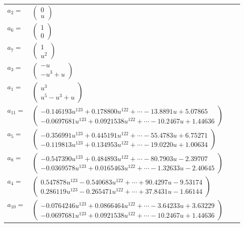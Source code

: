 \documentclass[1p]{elsarticle_modified}
\theoremstyle{definition}
\begin{document}
\begin{tabular}{m{7pt} m{180pt} m{7pt} m{180pt} }
\flushright $a_{2}=$&$\begin{pmatrix}0\\u\end{pmatrix}$ \\
\flushright $a_{6}=$&$\begin{pmatrix}1\\0\end{pmatrix}$ \\
\flushright $a_{7}=$&$\begin{pmatrix}1\\u^2\end{pmatrix}$ \\
\flushright $a_{3}=$&$\begin{pmatrix}- u\\- u^3+u\end{pmatrix}$ \\
\flushright $a_{1}=$&$\begin{pmatrix}u^3\\u^5- u^3+u\end{pmatrix}$ \\
\flushright $a_{11}=$&$\begin{pmatrix}-0.146193 u^{123}+0.178800 u^{122}+\cdots-13.8891 u+5.07865\\-0.0697681 u^{123}+0.0921538 u^{122}+\cdots-10.2467 u+1.44636\end{pmatrix}$ \\
\flushright $a_{5}=$&$\begin{pmatrix}-0.356991 u^{123}+0.445191 u^{122}+\cdots-55.4783 u+6.75271\\-0.119813 u^{123}+0.134953 u^{122}+\cdots-19.0220 u+1.00634\end{pmatrix}$ \\
\flushright $a_{8}=$&$\begin{pmatrix}-0.547390 u^{123}+0.484893 u^{122}+\cdots-80.7903 u-2.39707\\-0.0369578 u^{123}+0.0165463 u^{122}+\cdots-1.32633 u-2.40645\end{pmatrix}$ \\
\flushright $a_{4}=$&$\begin{pmatrix}0.547878 u^{123}-0.540683 u^{122}+\cdots+90.4297 u-9.53174\\0.286119 u^{123}-0.265471 u^{122}+\cdots+37.8431 u-1.66144\end{pmatrix}$ \\
\flushright $a_{10}=$&$\begin{pmatrix}-0.0764246 u^{123}+0.0866464 u^{122}+\cdots-3.64233 u+3.63229\\-0.0697681 u^{123}+0.0921538 u^{122}+\cdots-10.2467 u+1.44636\end{pmatrix}$ \\

\end{tabular}
\end{document}
